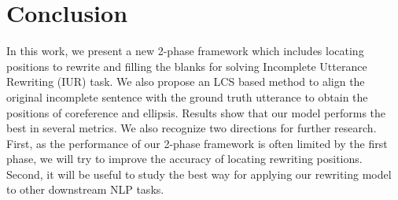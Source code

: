 \section{Conclusion}
In this work, we present a new 2-phase 
framework
which includes locating positions to rewrite
and filling the blanks
for solving Incomplete Utterance Rewriting (IUR) task.
We also propose an LCS based method 
to align the original
incomplete sentence with the ground truth utterance to obtain the positions of coreference and ellipsis.
Results show that 
our model performs the best in several metrics. 
We also recognize two directions for further research.
First, as the performance of 
our 2-phase framework is often limited by 
the first phase, 
we will try to improve the accuracy of locating rewriting positions.
Second, it will be useful to study
the best way for applying our
rewriting model to 
other downstream NLP tasks.
